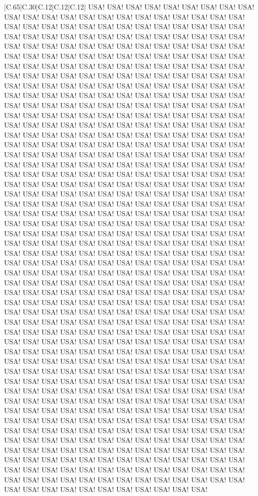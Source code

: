 \documentclass[11pt]{article}
\newlength\mylength
\begin{document}
\begin{center}
\begin{longtable}{|C{.65\mylength}|C{.30\mylength}|C{.12\mylength}|C{.12\mylength}|C{.12\mylength}|}
USA! USA! USA! USA! USA! USA! USA! USA! USA! USA! USA! USA! USA! USA! USA! USA! USA! USA! USA! USA! USA! USA! USA! USA! USA! USA! USA! USA! USA! USA! USA! USA! USA! USA! USA! USA! USA! USA! USA! USA! USA! USA! USA! USA! USA! USA! USA! USA! USA! USA! USA! USA! USA! USA! USA! USA! USA! USA! USA! USA! USA! USA! USA! USA! USA! USA! USA! USA! USA! USA! USA! USA! USA! USA! USA! USA! USA! USA! USA! USA! USA! USA! USA! USA! USA! USA! USA! USA! USA! USA! USA! USA! USA! USA! USA! USA! USA! USA! USA! USA! USA! USA! USA! USA! USA! USA! USA! USA! USA! USA! USA! USA! USA! USA! USA! USA! USA! USA! USA! USA! USA! USA! USA! USA! USA! USA! USA! USA! USA! USA! USA! USA! USA! USA! USA! USA! USA! USA! USA! USA! USA! USA! USA! USA! USA! USA! USA! USA! USA! USA! USA! USA! USA! USA! USA! USA! USA! USA! USA! USA! USA! USA! USA! USA! USA! USA! USA! USA! USA! USA! USA! USA! USA! USA! USA! USA! USA! USA! USA! USA! USA! USA! USA! USA! USA! USA! USA! USA! USA! USA! USA! USA! USA! USA! USA! USA! USA! USA! USA! USA! USA! USA! USA! USA! USA! USA! USA! USA! USA! USA! USA! USA! USA! USA! USA! USA! USA! USA! USA! USA! USA! USA! USA! USA! USA! USA! USA! USA! USA! USA! USA! USA! USA! USA! USA! USA! USA! USA! USA! USA! USA! USA! USA! USA! USA! USA! USA! USA! USA! USA! USA! USA! USA! USA! USA! USA! USA! USA! USA! USA! USA! USA! USA! USA! USA! USA! USA! USA! USA! USA! USA! USA! USA! USA! USA! USA! USA! USA! USA! USA! USA! USA! USA! USA! USA! USA! USA! USA! USA! USA! USA! USA! USA! USA! USA! USA! USA! USA! USA! USA! USA! USA! USA! USA! USA! USA! USA! USA! USA! USA! USA! USA! USA! USA! USA! USA! USA! USA! USA! USA! USA! USA! USA! USA! USA! USA! USA! USA! USA! USA! USA! USA! USA! USA! USA! USA! USA! USA! USA! USA! USA! USA! USA! USA! USA! USA! USA! USA! USA! USA! USA! USA! USA! USA! USA! USA! USA! USA! USA! USA! USA! USA! USA! USA! USA! USA! USA! USA! USA! USA! USA! USA! USA! USA! USA! USA! USA! USA! USA! USA! USA! USA! USA! USA! USA! USA! USA! USA! USA! USA! USA! USA! USA! USA! USA! USA! USA! USA! USA! USA! USA! USA! USA! USA! USA! USA! USA! USA! USA! USA! USA! USA! USA! USA! USA! USA! USA! USA! USA! USA! USA! USA! USA! USA! USA! USA! USA! USA! USA! USA! USA! USA! USA! USA! USA! USA! USA! USA! USA! USA! USA! USA! USA! USA! USA! USA! USA! USA! USA! USA! USA! USA! USA! USA! USA! USA! USA! USA! USA! USA! USA! USA! USA! USA! USA! USA! USA! USA! USA! USA! USA! USA! USA! USA! USA! USA! USA! USA! USA! USA! USA! USA! USA! USA! USA! USA! USA! USA! USA! USA! USA! USA! USA! USA! USA! USA! USA! USA! USA! USA! USA! USA! USA! USA! USA! USA! USA! USA! USA! USA! USA! USA! USA! USA! USA! USA! USA! USA! USA! USA! USA! USA! USA! USA! USA! USA! USA! USA! USA! USA! USA! USA! USA! USA! USA! USA! USA! USA! USA! USA! USA! USA! USA! USA! USA! USA! USA! USA! USA! USA! USA! USA! USA! USA! USA! USA! USA! USA! USA! USA! USA! USA! USA! USA! USA! USA! USA! USA! USA! USA! USA! USA! USA! USA! USA! USA! USA! USA! USA! USA! USA! USA! USA! USA! USA! USA! USA! USA! USA! USA! USA! USA! USA! USA! USA! USA! USA! USA! USA! USA! USA! USA! USA! USA! USA! USA! USA! USA! USA! USA! USA! USA! USA! USA! USA! USA! USA! USA! USA! USA! USA! USA! USA! USA! USA! USA! USA! USA! USA! USA! USA! USA! USA! USA! USA! USA! USA! USA! USA! USA! USA! USA! USA! USA! 
\end{longtable}
\end{center}
\end{document}
